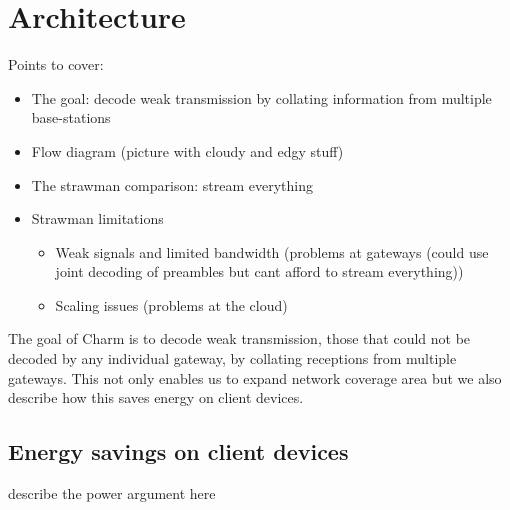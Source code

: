 \section{Architecture}
\label{sec:arch}

{\color{blue} Points to cover:

\begin{itemize}
    \item The goal: decode weak transmission by collating information from multiple base-stations
    \item Flow diagram (picture with cloudy and edgy stuff)
    \item The strawman comparison: stream everything
    \item Strawman limitations
        \begin{itemize}
            \item Weak signals and limited bandwidth (problems at gateways (could use joint decoding of preambles but cant afford to stream everything))
            \item Scaling issues (problems at the cloud)
        \end{itemize}
\end{itemize}
}


The goal of Charm is to decode weak transmission, those that could not be
decoded by any individual gateway, by collating receptions from multiple
gateways. This not only enables us to expand network coverage area but we also
describe how this saves energy on client devices.

\subsection{Energy savings on client devices}

{\color{blue} describe the power argument here}

